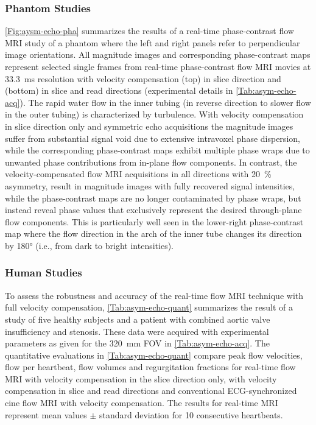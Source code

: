 \subsubsection*{Phantom Studies}
\cref{Fig:aysm-echo-pha} summarizes the results of a real-time phase-contrast flow MRI study of a phantom where the left and right panels refer to perpendicular image orientations. All magnitude images and corresponding phase-contrast maps represent selected single frames from real-time phase-contrast flow MRI movies at \SI{33.3}{\ms} resolution with velocity compensation (top) in slice direction and (bottom) in slice and read directions (experimental details in \cref{Tab:asym-echo-acq}). The rapid water flow in the inner tubing (in reverse direction to slower flow in the outer tubing) is characterized by turbulence. With velocity compensation in slice direction only and symmetric echo acquisitions the magnitude images suffer from substantial signal void due to extensive intravoxel phase dispersion, while the corresponding phase-contrast maps exhibit multiple phase wraps due to unwanted phase contributions from in-plane flow components. In contrast, the velocity-compensated flow MRI acquisitions in all directions with \SI{20}{\percent} asymmetry, result in magnitude images with fully recovered signal intensities, while the phase-contrast maps are no longer contaminated by phase wraps, but instead reveal phase values that exclusively represent the desired through-plane flow components. This is particularly well seen in the lower-right phase-contrast map where the flow direction in the arch of the inner tube changes its direction by \ang{180} (i.e., from dark to bright intensities).

\subsubsection*{Human Studies}
To assess the robustness and accuracy of the real-time flow MRI technique with full velocity compensation, \cref{Tab:asym-echo-quant} summarizes the result of a study of five healthy subjects and a patient with combined aortic valve insufficiency and stenosis. These data were acquired with experimental parameters as given for the \SI{320}{\mm} FOV in \cref{Tab:asym-echo-acq}. The quantitative evaluations in \cref{Tab:asym-echo-quant} compare peak flow velocities, flow per heartbeat, flow volumes and regurgitation fractions for real-time flow MRI with velocity compensation in the slice direction only, with velocity compensation in slice and read directions and conventional ECG-synchronized cine flow MRI with velocity compensation. The results for real-time MRI represent mean values $\pm$ standard deviation for \num{10} consecutive heartbeats.

